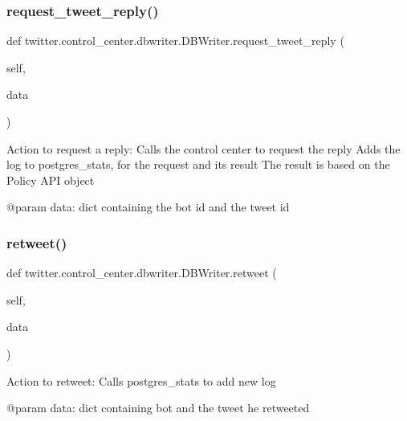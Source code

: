 \subsubsection{\texorpdfstring{request\+\_\+tweet\+\_\+reply()}{request\_tweet\_reply()}}
{\footnotesize\ttfamily def twitter.\+control\+\_\+center.\+dbwriter.\+D\+B\+Writer.\+request\+\_\+tweet\+\_\+reply (\begin{DoxyParamCaption}\item[{}]{self,  }\item[{}]{data }\end{DoxyParamCaption})}

\begin{DoxyVerb}Action to request a reply:
Calls the control center to request the reply
Adds the log to postgres_stats, for the request and its result
The result is based on the Policy API object

@param data: dict containing the bot id and the tweet id
\end{DoxyVerb}
 \mbox{\label{classtwitter_1_1control__center_1_1dbwriter_1_1DBWriter_a840d1892b618a29a5e44305cb6aa0211}} 
\subsubsection{\texorpdfstring{retweet()}{retweet()}}
{\footnotesize\ttfamily def twitter.\+control\+\_\+center.\+dbwriter.\+D\+B\+Writer.\+retweet (\begin{DoxyParamCaption}\item[{}]{self,  }\item[{}]{data }\end{DoxyParamCaption})}

\begin{DoxyVerb}Action to retweet:
Calls postgres_stats to add new log

@param data: dict containing bot and the tweet he retweeted
\end{DoxyVerb}
 \mbox{\label{classtwitter_1_1control__center_1_1dbwriter_1_1DBWriter_a6b55377307e8c59054e0f136942c4a79}} 
